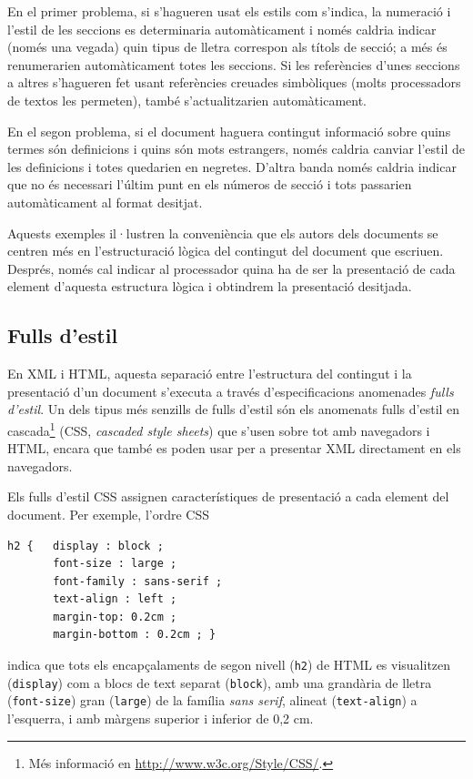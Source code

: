   En el primer problema, si s'hagueren usat els estils com s'indica,
  la numeració i l'estil de les seccions es determinaria
  automàticament i només caldria indicar (només una vegada)
  quin tipus de lletra
  correspon als títols de secció; a més és renumerarien automàticament
  totes les seccions. Si les referències d'unes seccions a altres
  s'hagueren fet usant referències creuades simbòliques (molts
  processadors de textos les permeten), també s'actualitzarien
  automàticament.
  
  En el segon problema, si el document haguera contingut informació
  sobre quins termes són definicions i quins són mots estrangers,
  només caldria canviar l'estil de les definicions i totes quedarien
  en negretes. D'altra banda només caldria indicar que no és necessari
  l'últim punt en els números de secció i tots passarien
  automàticament al format desitjat.
  
  Aquests exemples il·lustren la conveniència que els autors dels
  documents se centren més en l'estructuració lògica del contingut del
  document que escriuen. Després, només cal indicar al processador
  quina ha de ser la presentació de cada element d'aquesta estructura
  lògica i obtindrem la presentació desitjada.

\subsection{Fulls d'estil}

En XML i HTML, aquesta separació entre l'estructura del contingut i la
presentació d'un document s'executa a través d'especificacions
anomenades \emph{fulls d'estil}. Un dels tipus més senzills de fulls
d'estil són els anomenats fulls d'estil en cascada\footnote{Més
  informació en \url{http://www.w3c.org/Style/CSS/}.} (CSS,
\emph{cascaded style sheets}) que s'usen sobre tot amb navegadors i
HTML, encara que també es poden usar per a presentar XML directament
en els navegadors.

Els fulls d'estil CSS assignen característiques de presentació a cada
element del document. Per exemple, l'ordre CSS
\begin{verbatim}
h2 {   display : block ;
       font-size : large ;
       font-family : sans-serif ;
       text-align : left ;
       margin-top: 0.2cm ;
       margin-bottom : 0.2cm ; }
\end{verbatim}
indica que tots els encapçalaments de segon nivell (\texttt{h2}) de
HTML es visualitzen (\texttt{display}) com a blocs de text separat
(\texttt{block}), amb una grandària de lletra (\texttt{font-size}) gran
(\texttt{large}) de la família \emph{sans serif}, alineat
(\texttt{text-align}) a l'esquerra, i amb màrgens superior i inferior
de 0,2 cm.


